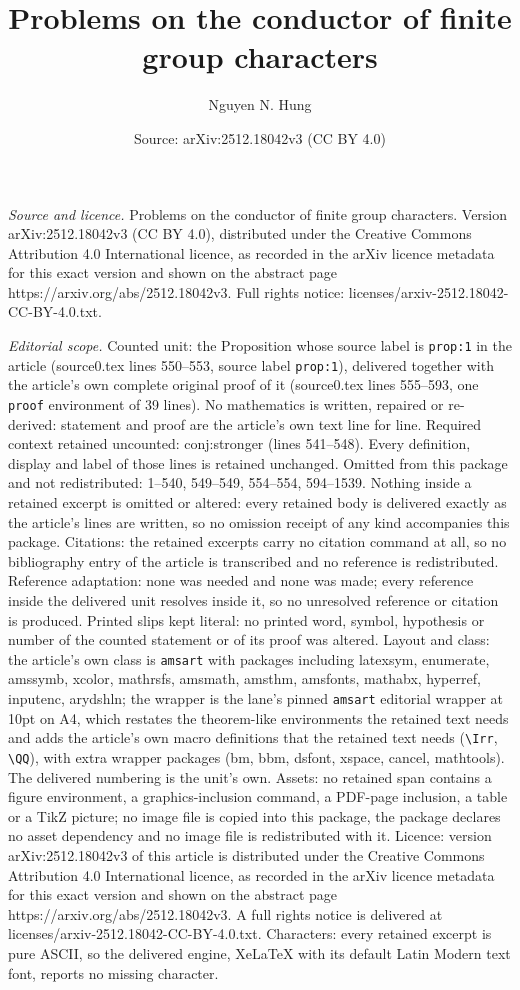 \documentclass[10pt,a4paper]{amsart}
\title[Problems on the conductor of finite group characters]{Problems on the conductor of finite group characters}
\author{Nguyen N. Hung}
\date{Source: arXiv:2512.18042v3 (CC BY 4.0)}
\begin{document}
\maketitle

\noindent\emph{Source and licence.} Problems on the conductor of finite group characters. Version arXiv:2512.18042v3 (CC BY 4.0), distributed under the Creative Commons Attribution 4.0 International licence, as recorded in the arXiv licence metadata for this exact version and shown on the abstract page https://arxiv.org/abs/2512.18042v3. Full rights notice: licenses/arxiv-2512.18042-CC-BY-4.0.txt.\par\smallskip

\noindent\textit{Editorial scope.} Counted unit: the Proposition whose source label is \texttt{prop:1} in the article (source0.tex lines 550--553, source label \texttt{prop:1}), delivered together with the article's own complete original proof of it (source0.tex lines 555--593, one \texttt{proof} environment of 39 lines). No mathematics is written, repaired or re-derived: statement and proof are the article's own text line for line. Required context retained uncounted: conj:stronger (lines 541--548). Every definition, display and label of those lines is retained unchanged. Omitted from this package and not redistributed: 1--540, 549--549, 554--554, 594--1539. Nothing inside a retained excerpt is omitted or altered: every retained body is delivered exactly as the article's lines are written, so no omission receipt of any kind accompanies this package. Citations: the retained excerpts carry no citation command at all, so no bibliography entry of the article is transcribed and no reference is redistributed. Reference adaptation: none was needed and none was made; every reference inside the delivered unit resolves inside it, so no unresolved reference or citation is produced. Printed slips kept literal: no printed word, symbol, hypothesis or number of the counted statement or of its proof was altered. Layout and class: the article's own class is \texttt{amsart} with packages including latexsym, enumerate, amssymb, xcolor, mathrsfs, amsmath, amsthm, amsfonts, mathabx, hyperref, inputenc, arydshln; the wrapper is the lane's pinned \texttt{amsart} editorial wrapper at 10pt on A4, which restates the theorem-like environments the retained text needs and adds the article's own macro definitions that the retained text needs (\texttt{\textbackslash Irr}, \texttt{\textbackslash QQ}), with extra wrapper packages (bm, bbm, dsfont, xspace, cancel, mathtools). The delivered numbering is the unit's own. Assets: no retained span contains a figure environment, a graphics-inclusion command, a PDF-page inclusion, a table or a TikZ picture; no image file is copied into this package, the package declares no asset dependency and no image file is redistributed with it. Licence: version arXiv:2512.18042v3 of this article is distributed under the Creative Commons Attribution 4.0 International licence, as recorded in the arXiv licence metadata for this exact version and shown on the abstract page https://arxiv.org/abs/2512.18042v3. A full rights notice is delivered at licenses/arxiv-2512.18042-CC-BY-4.0.txt. Characters: every retained excerpt is pure ASCII, so the delivered engine, XeLaTeX with its default Latin Modern text font, reports no missing character.
\end{document}
